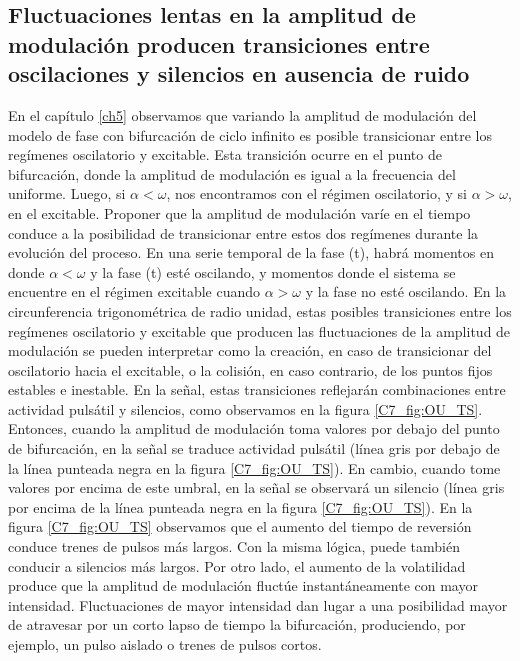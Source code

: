 \documentclass[./main.tex]{subfiles}
\begin{document}
\subsection{Fluctuaciones lentas en la amplitud de modulación producen transiciones entre oscilaciones y silencios en ausencia de ruido}

En el capítulo \ref{ch5} observamos que variando la amplitud de modulación del modelo de fase con bifurcación de ciclo infinito es posible transicionar entre los regímenes oscilatorio y excitable. Esta transición ocurre en el punto de bifurcación, donde la amplitud de modulación es igual a la frecuencia del uniforme. Luego, si $\alpha < \omega$, nos encontramos con el régimen oscilatorio, y si $\alpha > \omega$, en el excitable. Proponer que la amplitud de modulación varíe en el tiempo conduce a la posibilidad de transicionar entre estos dos regímenes durante la evolución del proceso. En una serie temporal de la fase \xx(t), habrá momentos en donde $\alpha < \omega$ y la fase \xx(t) esté oscilando, y momentos donde el sistema se encuentre en el régimen excitable cuando $\alpha > \omega$ y la fase no esté oscilando. En la circunferencia trigonométrica de radio unidad, estas posibles transiciones entre los regímenes oscilatorio y excitable que producen las fluctuaciones de la amplitud de modulación se pueden interpretar como la creación, en caso de transicionar del oscilatorio hacia el excitable, o la colisión, en caso contrario, de los puntos fijos estables e inestable. En la señal, estas transiciones reflejarán combinaciones entre actividad pulsátil y silencios, como observamos en la figura \ref{C7_fig:OU_TS}. Entonces, cuando la amplitud de modulación toma valores por debajo del punto de bifurcación, en la señal se traduce actividad pulsátil (línea gris por debajo de la línea punteada negra en la figura \ref{C7_fig:OU_TS}). En cambio, cuando tome valores por encima de este umbral, en la señal se observará un silencio (línea gris por encima de la línea punteada negra en la figura \ref{C7_fig:OU_TS}). En la figura \ref{C7_fig:OU_TS} observamos que el aumento del tiempo de reversión conduce trenes de pulsos más largos. Con la misma lógica, puede también conducir a silencios más largos. Por otro lado, el aumento de la volatilidad produce que la amplitud de modulación fluctúe instantáneamente con mayor intensidad. Fluctuaciones de mayor intensidad dan lugar a una posibilidad mayor de atravesar por un corto lapso de tiempo la bifurcación, produciendo, por ejemplo, un pulso aislado o trenes de pulsos cortos.
\end{document}
